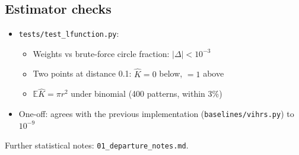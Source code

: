 \documentclass[11pt]{article}
\begin{document}
\subsection*{Estimator checks}
\begin{itemize}
  \item \texttt{tests/test\_lfunction.py}:
  \begin{itemize}
    \item Weights vs brute-force circle fraction: $|\Delta| < 10^{-3}$
    \item Two points at distance 0.1: $\hat K = 0$ below, $=1$ above
    \item $\mathbb E\hat K = \pi r^2$ under binomial (400 patterns, within 3\%)
  \end{itemize}
  \item One-off: agrees with the previous implementation (\texttt{baselines/vihrs.py}) to $10^{-9}$
\end{itemize}

Further statistical notes: \texttt{01\_departure\_notes.md}.
\end{document}
